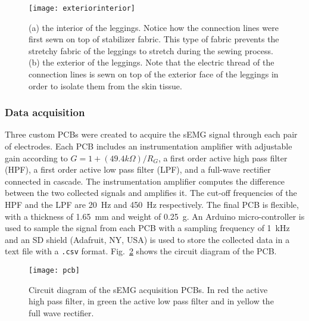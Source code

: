 \documentclass[letterpaper, 10 pt, conference]{ieeeconf}
\newcommand{\fref}[1]{Fig.~\ref{#1}}       \newcommand{\sref}[1]{\S\ref{#1}}          \newcommand{\tref}[1]{\tablename~\ref{#1}} \newcommand{\eref}[1]{(\ref{#1})}
\begin{document}
\begin{figure}[t!]
    \centering
    \texttt{[image: exteriorinterior]} \label{fig:interior} 
	\caption{(a) the interior of the leggings. Notice how the connection lines were first sewn on top of stabilizer fabric. This type of fabric prevents the stretchy fabric of the leggings to stretch during the sewing process. (b) the exterior of the leggings. Note that the electric thread of the connection lines is sewn on top of the exterior face of the leggings in order to isolate them from the skin tissue.}\label{f:leggings}
\end{figure}

\subsubsection{Data acquisition}
Three custom PCBs were created to acquire the sEMG signal through each pair of
electrodes. Each PCB includes an instrumentation amplifier with adjustable gain
according to $G=1+(49.4k\Omega)/R_G$, a first order active high pass filter
(HPF), a first order active low pass filter (LPF), and a full-wave rectifier
connected in cascade. The instrumentation amplifier computes the difference
between the two collected signals and amplifies it. The cut-off frequencies of
the HPF and the LPF are \SI{20}{\hertz} and \SI{450}{\hertz} respectively. The
final PCB is flexible, with a thickness of \SI{1.65}{\milli\meter} and weight
of \SI{0.25}{\gram}. An Arduino micro-controller is used to sample the signal
from each PCB with a sampling frequency of \SI{1}{\kilo\hertz} and an SD shield
(Adafruit, NY, USA) is used to store the collected data in a text file with a
\texttt{.csv} format. \fref{f:schematics} shows the circuit diagram of the PCB.

\begin{figure}[h!]
    \centering
    \texttt{[image: pcb]}
    \caption{Circuit diagram of the sEMG acquisition PCBs. In red the active high pass filter, in green the active low pass filter and in yellow the full wave rectifier.}
    \label{f:schematics}
\end{figure}
\end{document}
